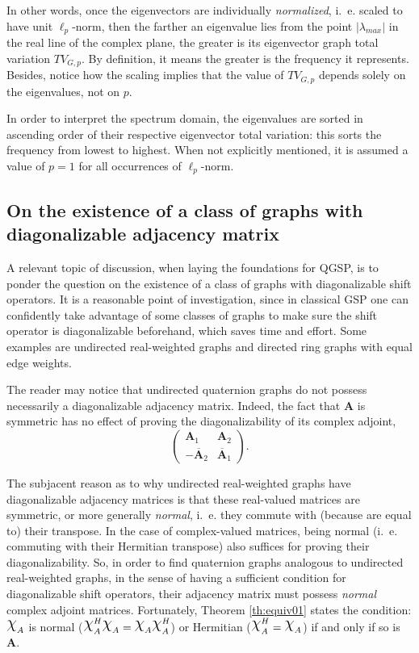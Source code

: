 In other words, once the eigenvectors are individually \textit{normalized}, i.~e. scaled to have unit $\ell_p$-norm, then the farther an eigenvalue lies from the point $|\lambda_{max}|$ in the real line of the complex plane, the greater is its eigenvector graph total variation $TV_{G, p}$. By definition, it means the greater is the frequency it represents. Besides, notice how the scaling implies that the value of $TV_{G, p}$ depends solely on the eigenvalues, not on $p$.

In order to interpret the spectrum domain, the eigenvalues are sorted in ascending order of their respective eigenvector total variation: this sorts the frequency from lowest to highest. When not explicitly mentioned, it is assumed a value of $p = 1$ for all occurrences of $\ell_p$-norm.

\subsection{On the existence of a class of graphs with diagonalizable adjacency matrix}

A relevant topic of discussion, when laying the foundations for QGSP, is to ponder the question on the existence of a class of graphs with diagonalizable shift operators. It is a reasonable point of investigation, since in classical GSP one can confidently take advantage of some classes of graphs to make sure the shift operator is diagonalizable beforehand, which saves time and effort. Some examples are undirected real-weighted graphs and directed ring graphs with equal edge weights.

The reader may notice that undirected quaternion graphs do not possess necessarily a diagonalizable adjacency matrix. Indeed, the fact that $\mathbf{A}$ is symmetric has no effect of proving the diagonalizability of its complex adjoint,
\begin{equation}
\begin{pmatrix}
\mathbf{A}_1 & \mathbf{A}_2\\ 
- \overline{\mathbf{A}}_2 & \overline{\mathbf{A}}_1
\end{pmatrix}.
\end{equation}

The subjacent reason as to why undirected real-weighted graphs have diagonalizable adjacency matrices is that these real-valued matrices are symmetric, or more generally \textit{normal}, i.~e. they commute with (because are equal to) their transpose. In the case of complex-valued matrices, being normal (i.~e. commuting with their Hermitian transpose) also suffices for proving their diagonalizability. So, in order to find quaternion graphs analogous to undirected real-weighted graphs, in the sense of having a sufficient condition for diagonalizable shift operators, their adjacency matrix must possess \textit{normal} complex adjoint matrices. Fortunately, Theorem \ref{th:equiv01} states the condition:
 $ \rchi_{A}$ is normal ($ \rchi_{A}^H \rchi_{A} = \rchi_{A} \rchi_{A}^H $) or Hermitian ($\rchi_{A}^H = \rchi_{A}$) if and only if so is $ \mathbf{A}$.
 
